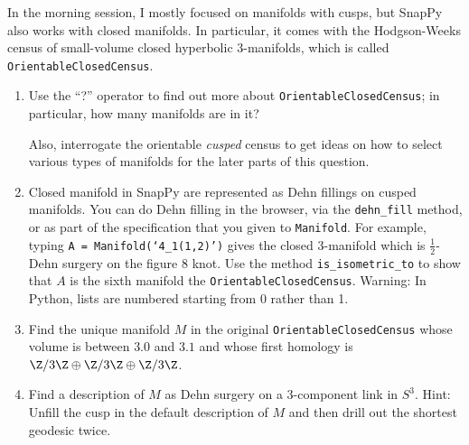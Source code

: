 \documentclass[tikz, a4paper]{nmd/hw}
\begin{document}
\begin{problems}
\item In the morning session, I mostly focused on manifolds with
  cusps, but SnapPy also works with closed manifolds.  In particular,
  it comes with the Hodgson-Weeks census of small-volume closed
  hyperbolic 3-manifolds, which is called
  \texttt{OrientableClosedCensus}.

  \begin{enumerate}
    \item Use the ``?'' operator to find out more about
      \texttt{OrientableClosedCensus}; in particular, how many
      manifolds are in it?  

      Also, interrogate the orientable \emph{cusped} census to get
      ideas on how to select various types of manifolds for the later
      parts of this question.
      
    \item Closed manifold in SnapPy are represented as Dehn fillings
      on cusped manifolds.  You can do Dehn filling in the browser,
      via the \texttt{dehn\_fill} method, or as part of the
      specification that you given to \texttt{Manifold}.  For example,
      typing \texttt{A = Manifold(`4\_1(1,2)')} gives the closed
      3-manifold which is $\frac{1}{2}$-Dehn surgery on the figure 8
      knot.  Use the method \texttt{is\_isometric\_to} to show that
      $A$ is the sixth manifold the \texttt{OrientableClosedCensus}.
      Warning: In Python, lists are numbered starting from 0
      rather than 1.

    \item Find the unique manifold $M$ in the original
      \texttt{OrientableClosedCensus} whose volume is between $3.0$
      and $3.1$ and whose first homology is
      $\Z/3\Z \oplus \Z/3\Z \oplus \Z/3\Z$.

    \item Find a description of $M$ as Dehn surgery on a 3-component
      link in $S^3$.  Hint: Unfill the cusp in the default description
      of $M$ and then drill out the shortest geodesic twice.  

  \end{enumerate}



\end{problems}
\end{document}
